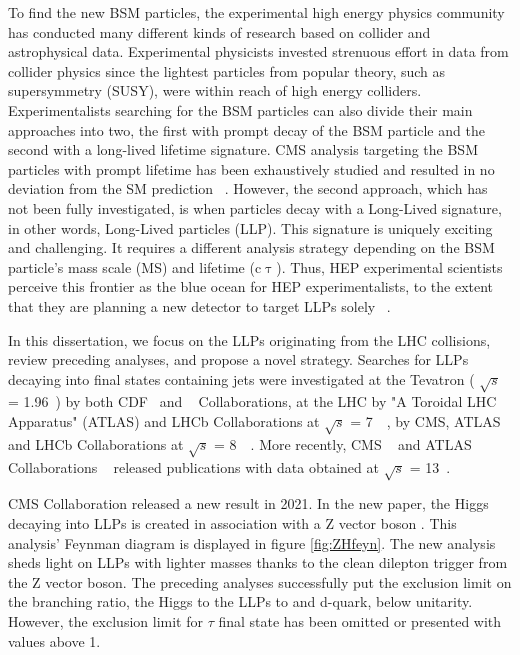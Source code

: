 To find the new BSM particles, the experimental high energy physics community has conducted many different kinds of research based on collider and astrophysical data.
Experimental physicists invested strenuous effort in data from collider physics since the lightest particles from popular theory, such as supersymmetry (SUSY), were within reach of high energy colliders.
Experimentalists searching for the BSM particles can also divide their main approaches into two, the first with prompt decay of the BSM particle and the second with a long-lived lifetime signature.
CMS analysis targeting the BSM particles with prompt lifetime has been exhaustively studied and resulted in no deviation from the SM prediction ~\cite{SUSY}.
However, the second approach, which has not been fully investigated, is when particles decay with a Long-Lived signature, in other words, Long-Lived particles (LLP).
This signature is uniquely exciting and challenging.
It requires a different analysis strategy depending on the BSM particle's mass scale (MS) and lifetime (c$\uptau$).
Thus, HEP experimental scientists perceive this frontier as the blue ocean for HEP experimentalists, to the extent that they are planning a new detector to target LLPs solely ~\cite{Barron:2022aac}.

In this dissertation, we focus on the LLPs originating from the LHC collisions, review preceding analyses, and propose a novel strategy.
Searches for LLPs decaying into final states containing jets were investigated
at the Tevatron ( $\sqrt{s}$ = 1.96~\TeV) by both CDF~\cite{Aaltonen:2011rja} and \DZERO~\cite{Abazov:2009ik} Collaborations,
at the LHC by "A Toroidal LHC Apparatus" (ATLAS) and LHCb Collaborations at $\sqrt{s}$ = 7~\TeV~\cite{ATLAS:2012av,Aaij:2014nma},
by CMS, ATLAS and LHCb Collaborations at $\sqrt{s}$ = 8~\TeV~\cite{Aad:2015uaa,Aad:2015rba,PhysRevD.91.012007,Aad:2015asa,Aaij:2017mic,Aaij:2016xmb,Aaij:2015ica}.
More recently, CMS ~\cite{Sirunyan:2017jdo,displacedvertices,displacedjets2016,delayedjets,emergingjets,CMS-PAS-EXO-19-021}
 and ATLAS Collaborations ~\cite{Aaboud:2018iil,Aaboud:2018jbr,Aaboud:2018arf,Aaboud:2018aqj,Aaboud:2018kbe,Aaboud:2019trc,Aaboud:2019opc,Aad:2019kiz,Aad:2019pfm,Aad:2019tcc,Aad:2019xav,Aad:2019tua} released publications with data obtained at $\sqrt{s}$ = 13~\TeV.

CMS Collaboration released a new result in 2021.
In the new paper, the Higgs decaying into LLPs is created in association with a Z vector boson \cite{ZHAN}.
This analysis' Feynman diagram is displayed in figure \ref{fig:ZHfeyn}.
The new analysis sheds light on LLPs with lighter masses thanks to the clean dilepton trigger from the Z vector boson.
The preceding analyses successfully put the exclusion limit on the branching ratio, the Higgs to the LLPs to \PQb and d-quark, below unitarity. 
However, the exclusion limit for $\tau$ final state has been omitted or presented with values above 1.


